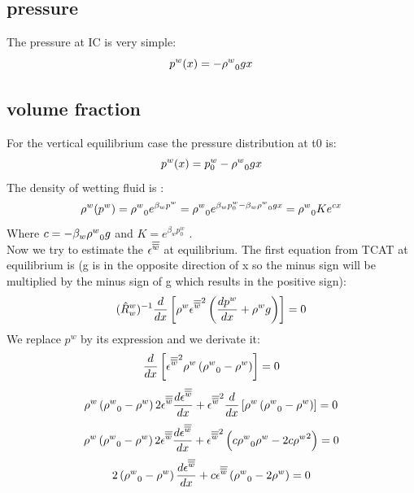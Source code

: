 \documentclass{article}
\begin{document}
\subsection{pressure }
The pressure at IC is very simple:
\begin{equation}
p^w(x)=-{{{\rho^{w}}}}_0  gx
\label{eq:pw_IC_V}
\end{equation}

\subsection{volume fraction}
For the vertical equilibrium case the pressure distribution at t0 is:
\begin{equation}
p^w(x)=p^w_0-{{{\rho^{w}}}}_0  gx
\label{eq:pw_IC}
\end{equation}
The density of wetting fluid is :
\begin{equation}
{{\rho^{w}}}(p^w)={{{\rho^{w}}}}_0 e^{{\beta}_w p^w}={{{\rho^{w}}}}_0 e^{{\beta}_wp^w_0-{\beta}_w {{{\rho^{w}}}}_0  gx}={{{\rho^{w}}}}_0 Ke^{cx}
\label{eq:rhow_IC}
\end{equation}
Where \(c=-{\beta}_w {{{\rho^{w}}}}_0  g\) and \(K=e^{{\beta}_w p^w_0}\) .\\
Now we try to estimate the \({{{\epsilon}^{{\overline{\overline{w}}}}}}\) at equilibrium. The first equation from TCAT at equilibrium is (g is in the opposite direction of x so the minus sign will be multiplied by the minus sign of g which results in the positive sign):
\begin{equation}
({{\hat{R}}}^w_w)^{-1}\frac{d}{dx}\left[{{\rho^{w}}}{{{\epsilon}^{{\overline{\overline{w}}}}}}^2 \left(\frac{d p^w}{dx}+{{\rho^{w}}} g \right)\right]=0
\label{eq:TCAT_eq0}
\end{equation}
We replace \(p^w\) by its expression and we derivate it:
\begin{equation}
\frac{d}{dx}\left[ {{{\epsilon}^{{\overline{\overline{w}}}}}}^2 {{\rho^{w}}}\left({{{\rho^{w}}}}_0-{{\rho^{w}}} \right)\right]=0
\label{eq:TCAT_eq1}
\end{equation}
\begin{equation}
{{\rho^{w}}}\left({{{\rho^{w}}}}_0-{{\rho^{w}}} \right)2{{{\epsilon}^{{\overline{\overline{w}}}}}}\frac{d {{{\epsilon}^{{\overline{\overline{w}}}}}}}{dx}+{{{\epsilon}^{{\overline{\overline{w}}}}}}^2\frac{d}{dx}\left[ {{\rho^{w}}}\left({{{\rho^{w}}}}_0-{{\rho^{w}}} \right)\right]=0
\label{eq:TCAT_eq1_2}
\end{equation}
\begin{equation}
{{\rho^{w}}}\left({{{\rho^{w}}}}_0-{{\rho^{w}}} \right)2{{{\epsilon}^{{\overline{\overline{w}}}}}}\frac{d {{{\epsilon}^{{\overline{\overline{w}}}}}}}{dx}
+{{{\epsilon}^{{\overline{\overline{w}}}}}}^2\left(c{{{\rho^{w}}}}_0{{{\rho^{w}}}}-2c{{{\rho^{w}}}}^2 \right)=0
\label{eq:TCAT_eq1_3}
\end{equation}
\begin{equation}
2\left({{{\rho^{w}}}}_0-{{\rho^{w}}} \right)\frac{d {{{\epsilon}^{{\overline{\overline{w}}}}}}}{dx}
+c{{{\epsilon}^{{\overline{\overline{w}}}}}}\left({{{\rho^{w}}}}_0-2{{{\rho^{w}}}} \right)=0
\label{eq:TCAT_eq1_4}
\end{equation}
\end{document}
